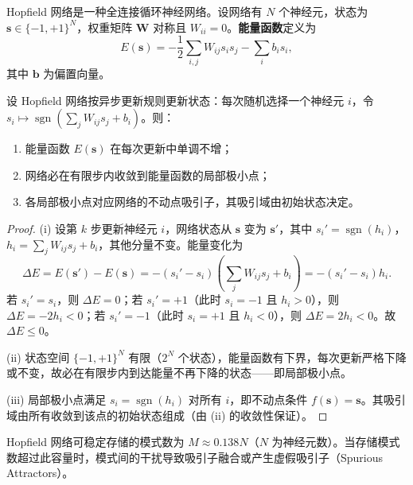 \begin{definition}\label{def:hopfield_energy}
Hopfield 网络是一种全连接循环神经网络。设网络有 $N$ 个神经元，状态为 $\mathbf{s}\in\{-1,+1\}^N$，权重矩阵 $\mathbf{W}$ 对称且 $W_{ii}=0$。\textbf{能量函数}定义为
\[
E(\mathbf{s})=-\frac{1}{2}\sum_{i,j}W_{ij}s_is_j-\sum_i b_is_i,
\]
其中 $\mathbf{b}$ 为偏置向量。
\end{definition}

\begin{theorem}\label{thm:hopfield_convergence}
设 Hopfield 网络按异步更新规则更新状态：每次随机选择一个神经元 $i$，令 $s_i\mapsto\operatorname{sgn}(\sum_jW_{ij}s_j+b_i)$。则：
\begin{enumerate}[label=(\roman*)]
    \item 能量函数 $E(\mathbf{s})$ 在每次更新中单调不增；
    \item 网络必在有限步内收敛到能量函数的局部极小点；
    \item 各局部极小点对应网络的不动点吸引子，其吸引域由初始状态决定。
\end{enumerate}
\end{theorem}

\begin{proof}
(i) 设第 $k$ 步更新神经元 $i$，网络状态从 $\mathbf{s}$ 变为 $\mathbf{s}'$，其中 $s_i'=\operatorname{sgn}(h_i)$，$h_i=\sum_jW_{ij}s_j+b_i$，其他分量不变。能量变化为
\[
\Delta E=E(\mathbf{s}')-E(\mathbf{s})=-(s_i'-s_i)\left(\sum_jW_{ij}s_j+b_i\right)=-(s_i'-s_i)h_i.
\]
若 $s_i'=s_i$，则 $\Delta E=0$；若 $s_i'=+1$（此时 $s_i=-1$ 且 $h_i>0$），则 $\Delta E=-2h_i<0$；若 $s_i'=-1$（此时 $s_i=+1$ 且 $h_i<0$），则 $\Delta E=2h_i<0$。故 $\Delta E\le0$。

(ii) 状态空间 $\{-1,+1\}^N$ 有限（$2^N$ 个状态），能量函数有下界，每次更新严格下降或不变，故必在有限步内到达能量不再下降的状态——即局部极小点。

(iii) 局部极小点满足 $s_i=\operatorname{sgn}(h_i)$ 对所有 $i$，即不动点条件 $f(\mathbf{s})=\mathbf{s}$。其吸引域由所有收敛到该点的初始状态组成（由 (ii) 的收敛性保证）。
\end{proof}

\begin{corollary}\label{cor:hopfield_capacity}
Hopfield 网络可稳定存储的模式数为 $M\approx0.138N$（$N$ 为神经元数）。当存储模式数超过此容量时，模式间的干扰导致吸引子融合或产生虚假吸引子（Spurious Attractors）。
\end{corollary}

